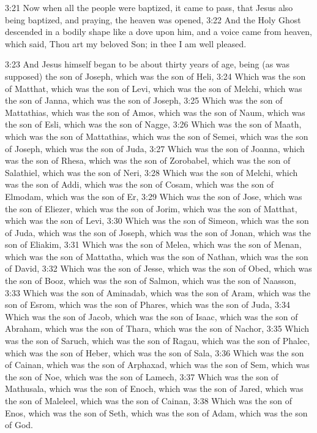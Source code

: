 3:21 Now when all the people were baptized, it came to pass, that Jesus also being baptized, and praying, the heaven was opened, 3:22 And the Holy Ghost descended in a bodily shape like a dove upon him, and a voice came from heaven, which said, Thou art my beloved Son; in thee I am well pleased.

3:23 And Jesus himself began to be about thirty years of age, being (as was supposed) the son of Joseph, which was the son of Heli, 3:24 Which was the son of Matthat, which was the son of Levi, which was the son of Melchi, which was the son of Janna, which was the son of Joseph, 3:25 Which was the son of Mattathias, which was the son of Amos, which was the son of Naum, which was the son of Esli, which was the son of Nagge, 3:26 Which was the son of Maath, which was the son of Mattathias, which was the son of Semei, which was the son of Joseph, which was the son of Juda, 3:27 Which was the son of Joanna, which was the son of Rhesa, which was the son of Zorobabel, which was the son of Salathiel, which was the son of Neri, 3:28 Which was the son of Melchi, which was the son of Addi, which was the son of Cosam, which was the son of Elmodam, which was the son of Er, 3:29 Which was the son of Jose, which was the son of Eliezer, which was the son of Jorim, which was the son of Matthat, which was the son of Levi, 3:30 Which was the son of Simeon, which was the son of Juda, which was the son of Joseph, which was the son of Jonan, which was the son of Eliakim, 3:31 Which was the son of Melea, which was the son of Menan, which was the son of Mattatha, which was the son of Nathan, which was the son of David, 3:32 Which was the son of Jesse, which was the son of Obed, which was the son of Booz, which was the son of Salmon, which was the son of Naasson, 3:33 Which was the son of Aminadab, which was the son of Aram, which was the son of Esrom, which was the son of Phares, which was the son of Juda, 3:34 Which was the son of Jacob, which was the son of Isaac, which was the son of Abraham, which was the son of Thara, which was the son of Nachor, 3:35 Which was the son of Saruch, which was the son of Ragau, which was the son of Phalec, which was the son of Heber, which was the son of Sala, 3:36 Which was the son of Cainan, which was the son of Arphaxad, which was the son of Sem, which was the son of Noe, which was the son of Lamech, 3:37 Which was the son of Mathusala, which was the son of Enoch, which was the son of Jared, which was the son of Maleleel, which was the son of Cainan, 3:38 Which was the son of Enos, which was the son of Seth, which was the son of Adam, which was the son of God.

